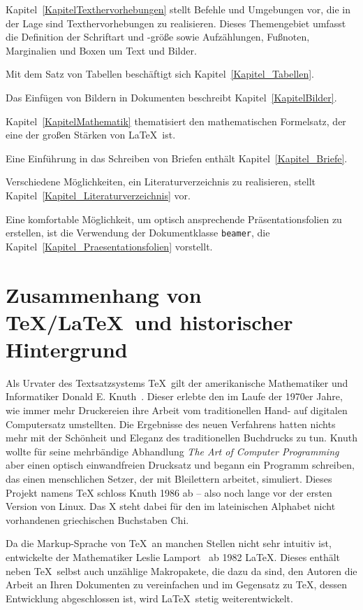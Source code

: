 \documentclass[a4paper,10pt,twoside]{scrbook}
\begin{document}
Kapitel~\ref{KapitelTexthervorhebungen} stellt Befehle und Umgebungen vor, die in der Lage sind Texthervorhebungen zu realisieren. Dieses Themengebiet umfasst die Definition der Schriftart und -größe sowie Aufzählungen, Fußnoten, Marginalien und Boxen um Text und Bilder. 

Mit dem Satz von Tabellen beschäftigt sich Kapitel~\ref{Kapitel_Tabellen}.

Das Einfügen von Bildern in Dokumenten beschreibt Kapitel~\ref{KapitelBilder}.

Kapitel~\ref{KapitelMathematik} thematisiert den mathematischen Formelsatz, der eine der großen Stärken von \LaTeX\ ist.

Eine Einführung in das Schreiben von Briefen enthält Kapitel~\ref{Kapitel_Briefe}.

Verschiedene Möglichkeiten, ein Literaturverzeichnis zu realisieren, stellt Kapitel~\ref{Kapitel_Literaturverzeichnis} vor.

Eine komfortable Möglichkeit, um optisch ansprechende Präsentationsfolien zu erstellen, ist die Verwendung der Dokumentklasse \verb!beamer!, die Kapitel~\ref{Kapitel_Praesentationsfolien} vorstellt.


\section{Zusammenhang von \TeX/\LaTeX\ und historischer Hintergrund}




Als Urvater des Textsatzsystems \TeX\ gilt der amerikanische Mathematiker und Informatiker 
Donald E. Knuth~\cite{DonaldKnuthWebpage}. Dieser erlebte den im Laufe der 1970er Jahre, wie immer mehr Druckereien ihre Arbeit vom traditionellen Hand- auf digitalen Computersatz umstellten. Die Ergebnisse des neuen Verfahrens hatten nichts mehr mit der Schönheit und Eleganz des traditionellen Buchdrucks zu tun. Knuth wollte für seine mehrbändige Abhandlung \textsl{The Art of Computer Programming} aber einen optisch einwandfreien Drucksatz und begann ein Programm schreiben, das einen menschlichen Setzer, der mit Bleilettern arbeitet, simuliert. Dieses Projekt namens TeX schloss Knuth 1986 ab -- also noch lange vor der ersten Version von Linux. Das X steht dabei für den im lateinischen Alphabet nicht vorhandenen griechischen Buchstaben Chi.

Da die Markup-Sprache von \TeX\ an manchen Stellen nicht sehr intuitiv ist, entwickelte der Mathematiker Leslie Lamport~\cite{LeslieLamportWebpage} ab 1982 \LaTeX. Dieses enthält neben \TeX\ selbst auch unzählige Makropakete, die dazu da sind, den Autoren die Arbeit an Ihren Dokumenten zu vereinfachen und im Gegensatz zu \TeX, dessen Entwicklung abgeschlossen ist, wird \LaTeX\ stetig weiterentwickelt.
\end{document}
